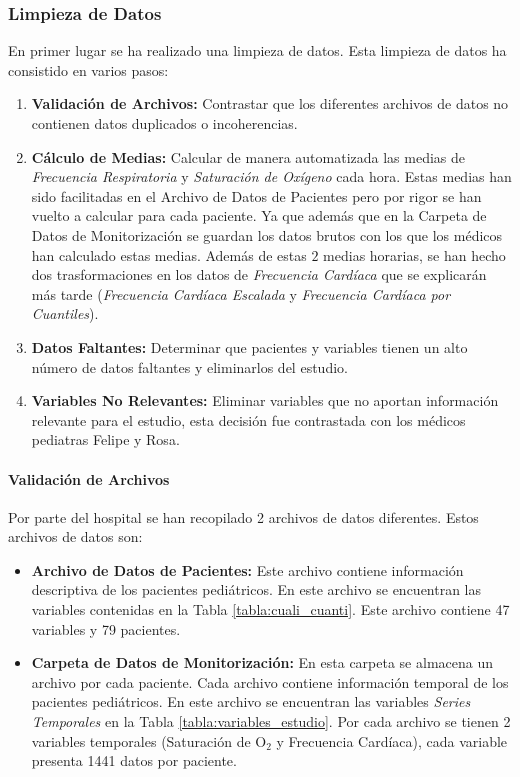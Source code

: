 \subsubsection{Limpieza de Datos}\label{sec:limpieza_datos}

En primer lugar se ha realizado una limpieza de datos. Esta limpieza de datos ha consistido en varios pasos: 

\begin{enumerate}
    \item \textbf{Validación de Archivos:} Contrastar que los diferentes archivos de datos no contienen datos duplicados o incoherencias.
    \item \textbf{Cálculo de Medias:} Calcular de manera automatizada las medias de \textit{Frecuencia Respiratoria} y \textit{Saturación de Oxígeno} cada hora. Estas medias han sido facilitadas en el Archivo de Datos de Pacientes pero por rigor se han vuelto a calcular para cada paciente. Ya que además que en la Carpeta de Datos de Monitorización se guardan los datos brutos con los que los médicos han calculado estas medias. Además de estas $2$ medias horarias, se han hecho dos trasformaciones en los datos de \textit{Frecuencia Cardíaca} que se explicarán más tarde (\textit{Frecuencia Cardíaca Escalada} y \textit{Frecuencia Cardíaca por Cuantiles}).
    \item \textbf{Datos Faltantes:} Determinar que pacientes y variables tienen un alto número de datos faltantes y eliminarlos del estudio.
    \item \textbf{Variables No Relevantes:} Eliminar variables que no aportan información relevante para el estudio, esta decisión fue contrastada con los médicos pediatras Felipe y Rosa.
\end{enumerate}



\paragraph{Validación de Archivos}

 
Por parte del hospital se han recopilado 2 archivos de datos diferentes. Estos archivos de datos son:

\begin{itemize}
    \item \textbf{Archivo de Datos de Pacientes:} Este archivo contiene información descriptiva de los pacientes pediátricos. En este archivo se encuentran las variables contenidas en la Tabla \ref{tabla:cuali_cuanti}. Este archivo contiene 47 variables y 79 pacientes.
    \item \textbf{Carpeta de Datos de Monitorización:} En esta carpeta se almacena un archivo por cada paciente. Cada archivo contiene información temporal de los pacientes pediátricos. En este archivo se encuentran las variables \textit{Series Temporales} en la Tabla \ref{tabla:variables_estudio}. Por cada archivo se tienen 2 variables temporales (Saturación de O$_2$ y Frecuencia Cardíaca), cada variable presenta 1441 datos por paciente.
\end{itemize}

